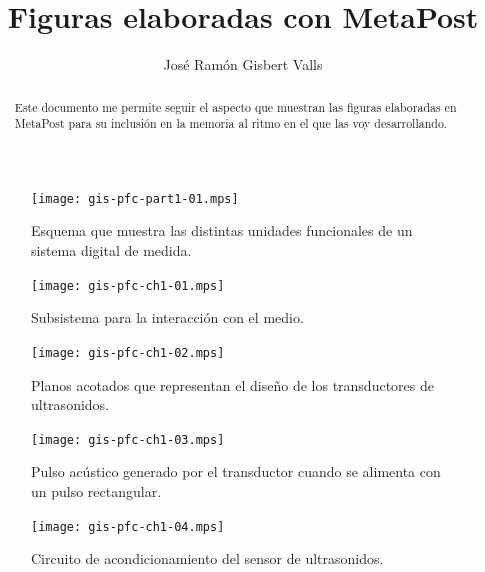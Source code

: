 \documentclass[a4paper,12pt]				{article}
\title{Figuras elaboradas con MetaPost}
\author{José Ramón Gisbert Valls}
\begin{document}
\maketitle{}

\begin{abstract}
	Este documento me permite seguir el aspecto que muestran las
	figuras elaboradas en MetaPost para su inclusión en la memoria al
	ritmo en el que las voy desarrollando.
\end{abstract}

\listoffigures

\begin{figure}
	\begin{center}
		\texttt{[image: gis-pfc-part1-01.mps]}
	\end{center}
	\caption[Sistema digital de medida]{Esquema que muestra las
	distintas unidades funcionales de un sistema digital de medida.}
	\label{fig:digmeasstm}
\end{figure}

\begin{figure}
	\begin{center}
		\texttt{[image: gis-pfc-ch1-01.mps]}
	\end{center}
	\caption[Subsistema para la interacción con el medio]{Subsistema
	para la interacción con el medio.}
	\label{fig:submedium}
\end{figure}

\begin{figure}
	\begin{center}
		\texttt{[image: gis-pfc-ch1-02.mps]}
	\end{center}
	\caption[Transductores de ultrasonidos]{Planos acotados que
	representan el diseño de los transductores de ultrasonidos.}
	\label{fig:transducers}
\end{figure}

\begin{figure}
	\begin{center}
		\texttt{[image: gis-pfc-ch1-03.mps]}
	\end{center}
	\caption[Pulso acústico generado por el transductor]{Pulso acústico
	generado por el transductor cuando se alimenta con un pulso
	rectangular.}
	\label{fig:pulse}
\end{figure}

\clearpage

\begin{figure}
	\begin{center}
		\texttt{[image: gis-pfc-ch1-04.mps]}
	\end{center}
	\caption[Circuito de acondicionamiento del sensor
	piezoeléctrico]{Circuito de acondicionamiento del sensor de
	ultrasonidos.}
	\label{fig:rxconditioner}
\end{figure}
\end{document}
